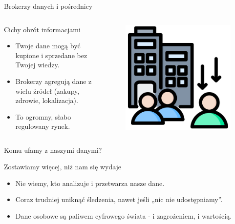     \begin{frame}{Brokerzy danych i pośrednicy}
    \begin{columns}[c]
        \begin{alertblock}{Cichy obrót informacjami}
            \begin{itemize}
              \item Twoje dane mogą być kupione i sprzedane bez Twojej wiedzy.
              \item Brokerzy agregują dane z wielu źródeł (zakupy, zdrowie, lokalizacja).
              \item To ogromny, słabo regulowany rynek.
            \end{itemize}
        \end{alertblock}
        \begin{figure}
          \centering
          \includegraphics[height=0.45\textheight]{images/enterprise.png}
        \end{figure}
    \end{columns}
    \end{frame}
    
    \begin{frame}{Komu ufamy z naszymi danymi?}
    \begin{alertblock}{Zostawiamy więcej, niż nam się wydaje}
        \begin{itemize}
          \item Nie wiemy, kto analizuje i przetwarza nasze dane.
          \item Coraz trudniej uniknąć śledzenia, nawet jeśli „nic nie udostępniamy”.
          \item Dane osobowe są paliwem cyfrowego świata - i zagrożeniem, i wartością.
        \end{itemize}
    \end{alertblock}
    \end{frame}
